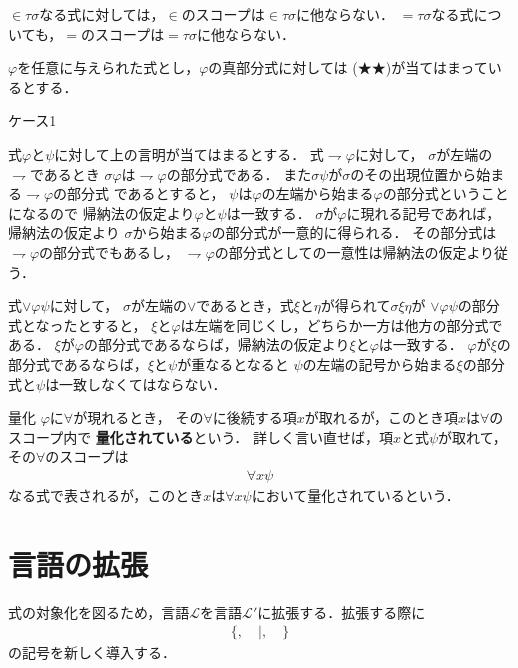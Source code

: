 \documentclass[a4j,10.5pt,oneside,openany]{jsbook}
\theoremstyle{mystyle}
\begin{document}
	$\in \tau \sigma$なる式に対しては，$\in$のスコープは$\in \tau \sigma$に他ならない．
	$= \tau \sigma$なる式についても，$=$のスコープは$= \tau \sigma$に他ならない．
	
	$\varphi$を任意に与えられた式とし，$\varphi$の真部分式に対しては
	(★★)が当てはまっているとする．
	
	\begin{description}
		\item[ケース1] 
	\end{description}
	式$\varphi$と$\psi$に対して上の言明が当てはまるとする．
	式$\rightharpoondown \varphi$に対して，
	$\sigma$が左端の$\rightharpoondown$であるとき
	$\sigma \varphi$は$\rightharpoondown \varphi$の部分式である．
	また$\sigma \psi$が$\sigma$のその出現位置から始まる$\rightharpoondown \varphi$の部分式
	であるとすると，
	$\psi$は$\varphi$の左端から始まる$\varphi$の部分式ということになるので
	帰納法の仮定より$\varphi$と$\psi$は一致する．
	$\sigma$が$\varphi$に現れる記号であれば，帰納法の仮定より
	$\sigma$から始まる$\varphi$の部分式が一意的に得られる．
	その部分式は$\rightharpoondown \varphi$の部分式でもあるし，
	$\rightharpoondown \varphi$の部分式としての一意性は帰納法の仮定より従う．
	
	式$\vee \varphi \psi$に対して，
	$\sigma$が左端の$\vee$であるとき，式$\xi$と$\eta$が得られて$\sigma \xi \eta$が
	$\vee \varphi \psi$の部分式となったとすると，
	$\xi$と$\varphi$は左端を同じくし，どちらか一方は他方の部分式である．
	$\xi$が$\varphi$の部分式であるならば，帰納法の仮定より$\xi$と$\varphi$は一致する．
	$\varphi$が$\xi$の部分式であるならば，$\xi$と$\psi$が重なるとなると
	$\psi$の左端の記号から始まる$\xi$の部分式と$\psi$は一致しなくてはならない．
	
	\begin{itembox}[l]{量化}
		$\varphi$に$\forall$が現れるとき，
		その$\forall$に後続する項$x$が取れるが，このとき項$x$は$\forall$のスコープ内で
		{\bf 量化されている}という．
		詳しく言い直せば，項$x$と式$\psi$が取れて，その$\forall$のスコープは
		\begin{align}
			\forall x \psi
		\end{align}
		なる式で表されるが，このとき$x$は$\forall x \psi$において量化されているという．
	\end{itembox}

\section{言語の拡張}
	式の対象化を図るため，言語$\mathcal{L}$を言語$\mathcal{L}'$に拡張する．拡張する際に
	\begin{align}
		\{, \quad |, \quad \}
	\end{align}
	の記号を新しく導入する．
	
\end{document}
